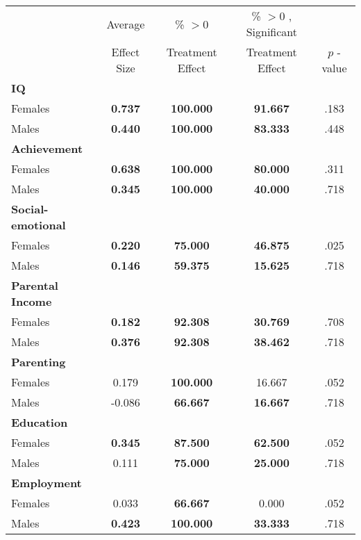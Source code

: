 \begin{tabular}{l c c c c}
\toprule
 & Average & \% $ >0 $ & \% $ >0 $ , Significant & \citet{Rosenbaum_2005_Distribution_JRSS} \\
 & Effect Size & Treatment Effect & Treatment Effect & $ p $ -value \\
\midrule
\textbf{IQ} & & & & \\
\quad Females &  \textbf{    0.737} & \textbf{  100.000} & \textbf{   91.667} & .183 \\
\quad Males &  \textbf{    0.440} & \textbf{  100.000} & \textbf{   83.333} & .448 \\
\midrule
\textbf{Achievement} & & & & \\
\quad Females &  \textbf{    0.638} & \textbf{  100.000} & \textbf{   80.000} & .311 \\
\quad Males &  \textbf{    0.345} & \textbf{  100.000} & \textbf{   40.000} & .718 \\
\midrule
\textbf{Social-emotional} & & & & \\
\quad Females &  \textbf{    0.220} & \textbf{   75.000} & \textbf{   46.875} & .025 \\
\quad Males &  \textbf{    0.146} & \textbf{   59.375} & \textbf{   15.625} & .718 \\
\midrule
\textbf{Parental Income} & & & & \\
\quad Females &  \textbf{    0.182} & \textbf{   92.308} & \textbf{   30.769} & .708 \\
\quad Males &  \textbf{    0.376} & \textbf{   92.308} & \textbf{   38.462} & .718 \\
\midrule
\textbf{Parenting} & & & & \\
\quad Females &      0.179 & \textbf{  100.000} &    16.667 & .052 \\
\quad Males &     -0.086 & \textbf{   66.667} & \textbf{   16.667} & .718 \\
\midrule
\textbf{Education} & & & & \\
\quad Females &  \textbf{    0.345} & \textbf{   87.500} & \textbf{   62.500} & .052 \\
\quad Males &      0.111 & \textbf{   75.000} & \textbf{   25.000} & .718 \\
\midrule
\textbf{Employment} & & & & \\
\quad Females &      0.033 & \textbf{   66.667} &     0.000 & .052 \\
\quad Males &  \textbf{    0.423} & \textbf{  100.000} & \textbf{   33.333} & .718 \\

\end{tabular}
